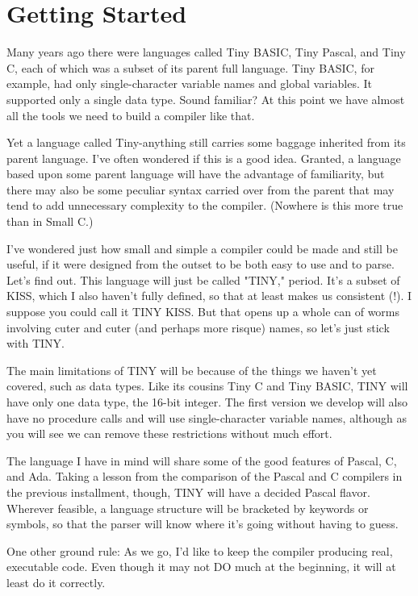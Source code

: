 \documentclass[float=false, crop=false]{standalone}
\begin{document}
\section{Getting Started}

Many years ago there were languages called Tiny BASIC, Tiny Pascal, and Tiny C,
each of which was a subset of its parent full language. Tiny BASIC, for example,
had only single-character variable names and global variables. It supported only
a single data type. Sound familiar? At this point we have almost all the tools
we need to build a compiler like that.

Yet a language called Tiny-anything still carries some baggage inherited from
its parent language. I've often wondered if this is a good idea. Granted, a
language based upon some parent language will have the advantage of familiarity,
but there may also be some peculiar syntax carried over from the parent that may
tend to add unnecessary complexity to the compiler. (Nowhere is this more true
than in Small C.)

I've wondered just how small and simple a compiler could be made and still be
useful, if it were designed from the outset to be both easy to use and to parse.
Let's find out. This language will just be called "TINY," period. It's a subset
of KISS, which I also haven't fully defined, so that at least makes us
consistent (!). I suppose you could call it TINY KISS. But that opens up a whole
can of worms involving cuter and cuter (and perhaps more risque) names, so let's
just stick with TINY.

The main limitations of TINY will be because of the things we haven't yet
covered, such as data types. Like its cousins Tiny C and Tiny BASIC, TINY will
have only one data type, the 16-bit integer. The first version we develop will
also have no procedure calls and will use single-character variable names,
although as you will see we can remove these restrictions without much effort.

The language I have in mind will share some of the good features of Pascal, C,
and Ada. Taking a lesson from the comparison of the Pascal and C compilers in
the previous installment, though, TINY will have a decided Pascal flavor.
Wherever feasible, a language structure will be bracketed by keywords or
symbols, so that the parser will know where it's going without having to guess.

One other ground rule: As we go, I'd like to keep the compiler producing real,
executable code. Even though it may not DO much at the beginning, it will at
least do it correctly.
\end{document}

